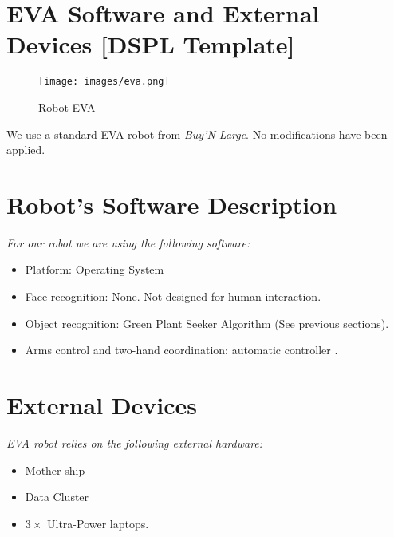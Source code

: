 \section{EVA Software and External Devices [DSPL Template]}

\setlength\intextsep{0pt}

\begin{figure}
	\centering
	\texttt{[image: images/eva.png]}
	\caption{Robot EVA}
	\label{fig:eva}
\end{figure}

We use a standard EVA robot from \textit{Buy'N Large}. No modifications have been applied.

\section*{Robot's Software Description}

\textit{For our robot we are using the following software:}

\begin{itemize}
	\item Platform: \BnL Operating System
	\item Face recognition: None. Not designed for human interaction.
	\item Object recognition: \BnL Green Plant Seeker Algorithm (See previous sections).
	\item Arms control and two-hand coordination: \BnL automatic controller \cite{bnl2}.
\end{itemize}

\section*{External Devices}

\textit{EVA robot relies on the following external hardware:}

\begin{itemize}
	\item \BnL Mother-ship
	\item \BnL Data Cluster
	\item $3 \times$ \BnL Ultra-Power laptops.
\end{itemize}

